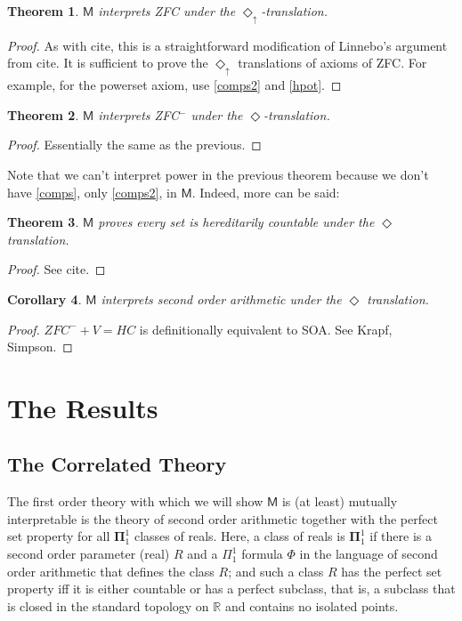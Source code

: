\documentclass{article}
\newtheorem{Theorem}{Theorem}[section]
\newtheorem{Corollary}[Theorem]{Corollary}
\theoremstyle{definition}
\newcommand{\du}{\Diamond_\uparrow}
\begin{document}
\begin{Theorem}
    $\mathsf{M}$ interprets ZFC under the $\du$-translation.
\end{Theorem}
\begin{proof}
    As with cite, this is a straightforward modification of 
    Linnebo's argument from cite. It is sufficient to prove the $\du$ 
    translations of axioms of ZFC. For example, for the powerset 
    axiom, use \eqref{comps2} and \eqref{hpot}.
\end{proof}

\begin{Theorem}
    $\mathsf{M}$ interprets ZFC$^-$ under the $\Diamond$-translation.
\end{Theorem}
\begin{proof}
    Essentially the same as the previous. 
\end{proof}
Note that we can't interpret power in the previous theorem because we don't 
have \eqref{comps}, only \eqref{comps2}, in $\mathsf{M}$. Indeed, more
can be said:
\begin{Theorem}\label{hcount}
    $\mathsf{M}$ proves every set is hereditarily countable under the 
    $\Diamond$ translation.
\end{Theorem}
\begin{proof}
    See cite.
\end{proof}
\begin{Corollary}\label{soa}
    $\mathsf{M}$ interprets second order arithmetic under the $\Diamond$ translation.
\end{Corollary}
\begin{proof}
    $ZFC^- + V = HC$ is definitionally equivalent to SOA. See Krapf, Simpson.
\end{proof}

\section{The Results}
\subsection{The Correlated Theory}
The first order theory with which we will show $\mathsf{M}$ is (at least) 
mutually interpretable is the theory of second order arithmetic together with the 
perfect set property for all $\mathbf{\Pi}_1^1$ classes of reals. 
Here, a class of reals is $\mathbf{\Pi}_1^1$ if there is a second order parameter 
(real) $R$ and a $\Pi_1^1$ formula $\Phi$ in the language of second order arithmetic
that defines the class $R$; and such a class $R$ has the perfect set property iff 
it is either countable or has a perfect subclass, that is, a subclass that is closed 
in the standard topology on $\mathbb{R}$ and contains no isolated points. 
\end{document}
